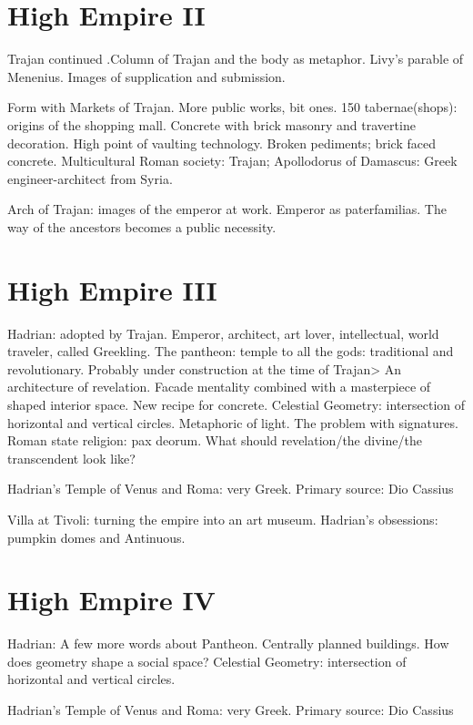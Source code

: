 \documentclass[10pt]{armath}
\begin{document}
\begin{multicols}{2}
\section{High Empire II}%
\label{sec:high_empire_ii}

Trajan continued .Column of Trajan and the body as metaphor. Livy's parable of
Menenius. Images of supplication and submission.

Form with Markets of Trajan. More public works, bit ones. 150 tabernae(shops):
origins of the shopping mall. Concrete with brick masonry and travertine
decoration. High point of vaulting technology. Broken pediments; brick faced
concrete. Multicultural Roman society: Trajan; Apollodorus of Damascus: Greek
engineer-architect from Syria.

Arch of Trajan: images of the emperor at work. Emperor as paterfamilias. The
way of the ancestors becomes a public necessity.

\section{High Empire III}%
\label{sec:high_empire_iii}

Hadrian: adopted by Trajan. Emperor, architect, art lover, intellectual, world
traveler, called Greekling. The pantheon: temple to all the gods: traditional
and revolutionary. Probably under construction at the time of Trajan> An
architecture of revelation. Facade mentality combined with a  masterpiece of
shaped interior space. New recipe for concrete. Celestial Geometry:
intersection of horizontal and vertical circles. Metaphoric of light. The
problem with signatures. Roman state religion: pax deorum. What should
revelation/the divine/the transcendent look like?

Hadrian's Temple of Venus and Roma: very Greek. Primary source: Dio Cassius

Villa at Tivoli: turning the empire into an art museum. Hadrian's obsessions:
pumpkin domes and Antinuous.

\section{High Empire IV}%
\label{sec:high_empire_iv}

Hadrian: A few more words about Pantheon. Centrally planned buildings. How does
geometry shape a social space? Celestial Geometry: intersection of horizontal
and vertical circles.

Hadrian's Temple of Venus and Roma: very Greek. Primary source: Dio Cassius


\end{multicols}
\end{document}
